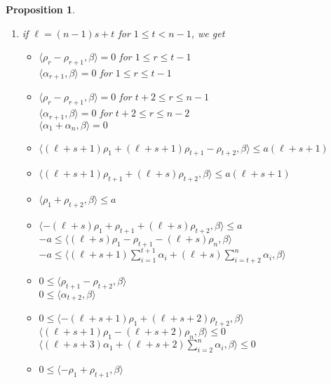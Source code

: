 \documentclass{amsart}
\newtheorem{proposition}[theorem]{Proposition}
\numberwithin{theorem}{section}
\begin{document}
\begin{proposition}
\begin{enumerate}
\begin{itemize}
            $\langle (\ell+s+1)\sum_{i=1}^2\alpha_i+(\ell+s)\sum_{i=3}^n\alpha_i, \beta\rangle \le 0$\\
        \end{itemize}
      \item if $\ell=(n-1)s+t$ for $1\le t < n-1$, we get 
        \begin{itemize}
          \item $\langle \rho_r-\rho_{r+1}, \beta\rangle = 0$ for $1\le r\le t-1$\\
            $\langle \alpha_{r+1}, \beta\rangle = 0$ for $1\le r\le t-1$\\
          \item $\langle \rho_r-\rho_{r+1}, \beta\rangle = 0$ for $t+2\le r\le n-1$\\
            $\langle \alpha_{r+1}, \beta\rangle = 0$ for $t+2\le r\le n-2$\\
            $\langle \alpha_1+\alpha_n, \beta\rangle = 0$\\
          \item $\langle (\ell+s+1)\rho_1+(\ell+s+1)\rho_{t+1}-\rho_{t+2}, \beta\rangle \le a(\ell+s+1)$
          \item $\langle (\ell+s+1)\rho_{t+1}+(\ell+s)\rho_{t+2}, \beta\rangle \le a(\ell+s+1)$
          \item $\langle \rho_1+\rho_{t+2}, \beta\rangle \le a$\\
          \item $\langle -(\ell+s)\rho_1+\rho_{t+1}+(\ell+s)\rho_{t+2}, \beta\rangle \le a$\\
            $-a \le \langle (\ell+s)\rho_1-\rho_{t+1}-(\ell+s)\rho_n, \beta\rangle$\\
            $-a\le \langle (\ell+s+1)\sum_{i=1}^{t+1}\alpha_i+(\ell+s)\sum_{i=t+2}^n\alpha_i, \beta\rangle$\\
          \item $0 \le \langle \rho_{t+1}-\rho_{t+2}, \beta\rangle$\\
            $0 \le \langle \alpha_{t+2}, \beta\rangle$\\
          \item $0 \le \langle -(\ell+s+1)\rho_1+(\ell+s+2)\rho_{t+2}, \beta\rangle$\\
            $\langle (\ell+s+1)\rho_1-(\ell+s+2)\rho_n, \beta\rangle \le 0$\\
            $\langle (\ell+s+3)\alpha_1+(\ell+s+2)\sum_{i=2}^n\alpha_i, \beta\rangle \le 0$\\
          \item $0 \le \langle -\rho_1+\rho_{t+1}, \beta\rangle$\\

\end{itemize}
\end{enumerate}
\end{proposition}
\end{document}
